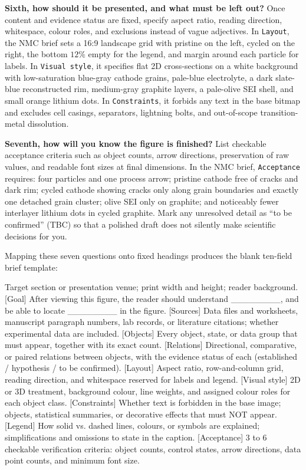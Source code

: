 \textbf{Sixth, how should it be presented, and what must be left out?} Once content and evidence status are fixed, specify aspect ratio, reading direction, whitespace, colour roles, and exclusions instead of vague adjectives. In \texttt{Layout}, the NMC brief sets a 16:9 landscape grid with pristine on the left, cycled on the right, the bottom $12\%$ empty for the legend, and margin around each particle for labels. In \texttt{Visual style}, it specifies flat 2D cross-sections on a white background with low-saturation blue-gray cathode grains, pale-blue electrolyte, a dark slate-blue reconstructed rim, medium-gray graphite layers, a pale-olive SEI shell, and small orange lithium dots. In \texttt{Constraints}, it forbids any text in the base bitmap and excludes cell casings, separators, lightning bolts, and out-of-scope transition-metal dissolution.

\textbf{Seventh, how will you know the figure is finished?} List checkable acceptance criteria such as object counts, arrow directions, preservation of raw values, and readable font sizes at final dimensions. In the NMC brief, \texttt{Acceptance} requires: four particles and one process arrow; pristine cathode free of cracks and dark rim; cycled cathode showing cracks only along grain boundaries and exactly one detached grain cluster; olive SEI only on graphite; and noticeably fewer interlayer lithium dots in cycled graphite. Mark any unresolved detail as ``to be confirmed'' (TBC) so that a polished draft does not silently make scientific decisions for you.

Mapping these seven questions onto fixed headings produces the blank ten-field brief template:

\begin{Prompt}
 Target section or presentation venue; print width and height; reader background.
[Goal] After viewing this figure, the reader should understand ________, and be able to locate ________ in the figure.
[Sources] Data files and worksheets, manuscript paragraph numbers, lab records, or literature citations; whether experimental data are included.
[Objects] Every object, state, or data group that must appear, together with its exact count.
[Relations] Directional, comparative, or paired relations between objects, with the evidence status of each (established / hypothesis / to be confirmed).
[Layout] Aspect ratio, row-and-column grid, reading direction, and whitespace reserved for labels and legend.
[Visual style] 2D or 3D treatment, background colour, line weights, and assigned colour roles for each object class.
[Constraints] Whether text is forbidden in the base image; objects, statistical summaries, or decorative effects that must NOT appear.
[Legend] How solid vs. dashed lines, colours, or symbols are explained; simplifications and omissions to state in the caption.
[Acceptance] 3 to 6 checkable verification criteria: object counts, control states, arrow directions, data point counts, and minimum font size.
\end{Prompt}

